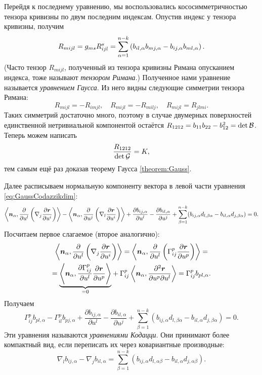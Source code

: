 Перейдя к последнему уравнению, мы воспользовались кососимметричностью тензора кривизны по двум последним индексам. Опустив индекс у тензора кривизны, получим
\[
	R_{mijl} = g_{ms}R^s_{ijl} = \sum_{\alpha = 1}^{n - k}\left(b_{il, \alpha}b_{mj, \alpha} - b_{ij, \alpha}b_{ml, \alpha}\right).
\]
(Часто тензор $R_{mijl}$, полученный из тензора кривизны Римана опусканием индекса, тоже называют \textit{тензором Римана}.) Полученное нами уравнение называется \textit{уравнением Гаусса}. Из него видны следующие симметрии тензора Римана:
\[
	R_{mijl} = -R_{imjl},\quad R_{mijl} = -R_{milj},\quad R_{mijl} = R_{jlmi}.
\]
Таких симметрий достаточно много, поэтому в случае двумерных поверхностей единственной нетривиальной компонентой остаётся $R_{1212} = b_{11}b_{22} - b_{12}^2 = \det\mathcal{B}$. Теперь можем написать
\[
	\frac{R_{1212}}{\det\mathcal{G}} = K,
\]
тем самым ещё раз доказав теорему Гаусса \ref{theorem:Gauss}.

Далее расписываем нормальную компоненту вектора в левой части уравнения \eqref{eq:GaussCodazzikdim}:
\[
	\left\langle\boldsymbol{n}_\alpha, \frac{\partial}{\partial u^l}\left(\nabla_j\frac{\partial\boldsymbol{r}}{\partial u^i}\right)\right\rangle - \left\langle\boldsymbol{n}_\alpha, \frac{\partial}{\partial u^j}\left(\nabla_l\frac{\partial\boldsymbol{r}}{\partial u^i}\right)\right\rangle + \frac{\partial b_{ij, \alpha}}{\partial u^l} - \frac{\partial b_{il, \alpha}}{\partial u^j} + \sum_{\beta = 1}^{n - k}(b_{ij, \alpha}d_{l, \beta\alpha} - b_{il, \alpha}d_{j, \beta\alpha}) = 0.
\]
Посчитаем первое слагаемое (второе аналогично):
\begin{multline*}
	\left\langle\boldsymbol{n}_\alpha, \frac{\partial}{\partial u^l}\left(\nabla_j\frac{\partial\boldsymbol{r}}{\partial u^i}\right)\right\rangle = \left\langle\boldsymbol{n}_\alpha, \frac{\partial}{\partial u^l}\left(\Gamma_{ij}^p\frac{\partial\boldsymbol{r}}{\partial u^p}\right)\right\rangle =\\ = {\underbrace{\left\langle\boldsymbol{n}_\alpha, \frac{\partial\Gamma_{ij}^p}{\partial u^l}\frac{\partial\boldsymbol{r}}{\partial u^p}\right\rangle}_{= 0}} + \Gamma_{ij}^p\left\langle\boldsymbol{n}_\alpha, \frac{\partial^2\boldsymbol{r}}{\partial u^p\partial u^l}\right\rangle = \Gamma_{ij}^pb_{pl, \alpha}.
\end{multline*}
Получаем
\[
	\Gamma_{ij}^pb_{pl, \alpha} - \Gamma_{il}^pb_{pj, \alpha} + \frac{\partial b_{ij, \alpha}}{\partial u^l} - \frac{\partial b_{il, \alpha}}{\partial u^j} + \sum_{\beta = 1}^{n - k}(b_{ij, \alpha}d_{l, \beta\alpha} - b_{il, \alpha}d_{j, \beta\alpha}) = 0.
\]
Эти уравнения называются \textit{уравнениями Кодацци}. Они принимают более компактный вид, если переписать их через ковариантные производные:
\[
	\nabla_lb_{ij, \alpha} - \nabla_jb_{il, \alpha} = \sum_{\beta = 1}^{n - k}(b_{ij, \alpha}d_{l, \alpha\beta} - b_{il, \alpha}d_{j, \alpha\beta}).
\]

